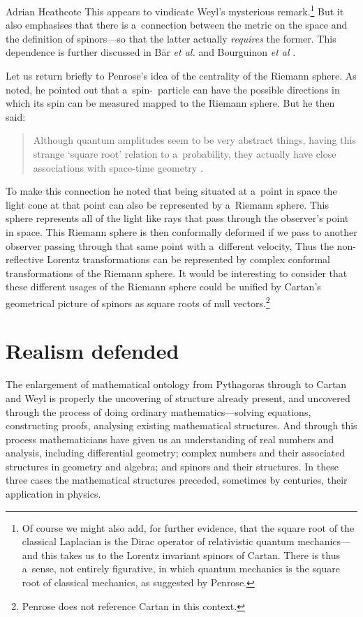 \begin{artengenv}{Adrian Heathcote}
This appears to vindicate Weyl's mysterious remark.\footnote{Of course we might also add, for further evidence, that the square root of the classical Laplacian is the Dirac operator of relativistic quantum mechanics---and this takes us to the Lorentz invariant spinors of Cartan. There is thus a~sense, not entirely figurative, in which quantum mechanics is the square root of classical mechanics, as suggested by Penrose.} But it also emphasises that there is a~connection between the metric on the space and the definition of spinors---so that the latter actually \textit{requires} the former. This dependence is further discussed in Bär \textit{et al.} \parencite*{bar_generalized_2005} and Bourguinon \textit{et al} \parencite*{bourguignon_spinorial_2015}.

Let us return briefly to Penrose's idea of the centrality of the Riemann sphere. As noted, he pointed out that a~spin-\textonehalf\ particle can have the possible directions in which its spin can be measured mapped to the Riemann sphere. But he then said:
\begin{quotation}
Although quantum amplitudes seem to be very abstract things, having this strange `square root' relation to a~probability, they actually have close associations with space-time geometry \parencite[230]{arnold_mathematical_2000}.
\end{quotation}
To make this connection he noted that being situated at a~point in space the light cone at that point can also be represented by a~Riemann sphere. This sphere represents all of the light like rays that pass through the observer's point in space. This Riemann sphere is then conformally deformed if we pass to another observer passing through that same point with a~different velocity, Thus the non-reflective Lorentz transformations can be represented by complex conformal transformations of the Riemann sphere. It would be interesting to consider that these different usages of the Riemann sphere could be unified by Cartan's geometrical picture of spinors as square roots of null vectors.\footnote{Penrose \parencite*{penrose_road_2004_ah} does not reference Cartan in this context.}


\section{Realism defended}


The enlargement of mathematical ontology from Pythagoras through to Cartan and Weyl is properly the uncovering of structure already present, and uncovered through the process of doing ordinary mathematics---solving equations, constructing proofs, analysing existing mathematical structures. And through this process mathematicians have given us an understanding of real numbers and analysis, including differential geometry; complex numbers and their associated structures in geometry and algebra; and spinors and their structures. In these three cases the mathematical structures preceded, sometimes by centuries, their application in physics. 


\end{artengenv}

